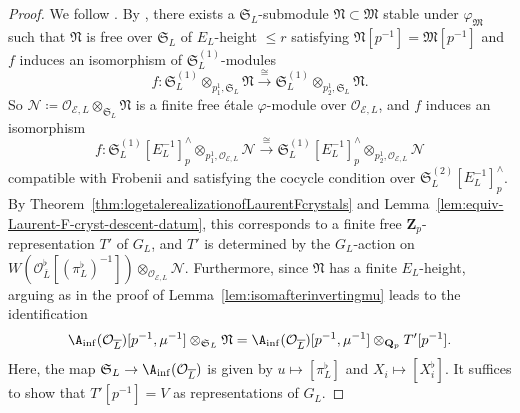 \begin{proof}
We follow \cite[Prop.~4.33, Pf.]{du-liu-moon-shimizu-completed-prismatic-F-crystal-loc-system}. By \cite[Prop.~4.34]{du-liu-moon-shimizu-completed-prismatic-F-crystal-loc-system}, there exists a $\mathfrak{S}_L$-submodule $\mathfrak{N} \subset \mathfrak{M}$ stable under $\varphi_{\mathfrak{M}}$ such that $\mathfrak{N}$ is free over $\mathfrak{S}_L$ of $E_L$-height $\leq r$ satisfying $\mathfrak{N}[p^{-1}] = \mathfrak{M}[p^{-1}]$ and $f$ induces an isomorphism of $\mathfrak{S}_L^{(1)}$-modules
\[
f\colon \mathfrak{S}_L^{(1)}\otimes_{p^1_1, \mathfrak{S}_L} \mathfrak{N} \stackrel{\cong}{\rightarrow} \mathfrak{S}_L^{(1)}\otimes_{p^1_2, \mathfrak{S}_L} \mathfrak{N}.
\] 
So $\mathcal{N}\coloneqq \mathcal{O}_{\mathcal{E}, L}\otimes_{\mathfrak{S}_L}\mathfrak{N}$ is a finite free \'etale $\varphi$-module over $\mathcal{O}_{\mathcal{E}, L}$, and $f$ induces an isomorphism 
\[
f\colon \mathfrak{S}_L^{(1)}[E_L^{-1}]^{\wedge}_{p}\otimes_{p^1_1, \mathcal{O}_{\mathcal{E}, L}} \mathcal{N} \stackrel{\cong}{\rightarrow} \mathfrak{S}_L^{(1)}[E_L^{-1}]^{\wedge}_p\otimes_{p^1_2, \mathcal{O}_{\mathcal{E}, L}} \mathcal{N}
\]
compatible with Frobenii and satisfying the cocycle condition over $\mathfrak{S}_L^{(2)}[E_L^{-1}]^{\wedge}_{p}$. By Theorem~\ref{thm:logetalerealizationofLaurentFcrystals} and Lemma~\ref{lem:equiv-Laurent-F-cryst-descent-datum}, this corresponds to a finite free $\mathbf{Z}_p$-representation $T'$ of $G_L$, and $T'$ is determined by the $G_L$-action on $W(\mathcal{O}_{\overline{L}}^{\flat}[(\pi_L^{\flat})^{-1}])\otimes_{\mathcal{O}_{\mathcal{E}, L}}\mathcal{N}$. Furthermore, since $\mathfrak{N}$ has a finite $E_L$-height, arguing as in the proof of Lemma~\ref{lem:isomafterinvertingmu} leads to the identification
\[
\A_{\inf}(\mathcal{O}_{\overline{L}})[p^{-1}, \mu^{-1}]\otimes_{\mathfrak{S}_L} \mathfrak{N} = \A_{\inf}(\mathcal{O}_{\overline{L}})[p^{-1}, \mu^{-1}]\otimes_{\mathbf{Q}_p} T'[p^{-1}]. 
\]
Here, the map $\mathfrak{S}_L \rightarrow \A_{\inf}(\mathcal{O}_{\overline{L}})$ is given by $u \mapsto [\pi_L^{\flat}]$ and $X_i \mapsto [X_i^{\flat}]$. It suffices to show that $T'[p^{-1}] = V$ as representations of $G_L$.


\end{proof}
